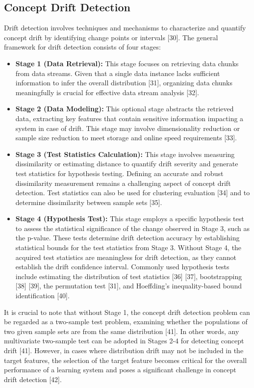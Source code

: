 \subsection{Concept Drift Detection}
Drift detection involves techniques and mechanisms to characterize and quantify concept drift by identifying change points or intervals [30]. The general framework for drift detection consists of four stages:
\begin{itemize}
    \item \textbf{Stage 1 (Data Retrieval):} This stage focuses on retrieving data chunks from data streams. Given that a single data instance lacks sufficient information to infer the overall distribution [31], organizing data chunks meaningfully is crucial for effective data stream analysis [32].
    \item \textbf{Stage 2 (Data Modeling):} This optional stage abstracts the retrieved data, extracting key features that contain sensitive information impacting a system in case of drift. This stage may involve dimensionality reduction or sample size reduction to meet storage and online speed requirements [33].
    \item \textbf{Stage 3 (Test Statistics Calculation):} This stage involves measuring dissimilarity or estimating distance to quantify drift severity and generate test statistics for hypothesis testing. Defining an accurate and robust dissimilarity measurement remains a challenging aspect of concept drift detection. Test statistics can also be used for clustering evaluation [34] and to determine dissimilarity between sample sets [35].
    \item \textbf{Stage 4 (Hypothesis Test):} This stage employs a specific hypothesis test to assess the statistical significance of the change observed in Stage 3, such as the p-value. These tests determine drift detection accuracy by establishing statistical bounds for the test statistics from Stage 3. Without Stage 4, the acquired test statistics are meaningless for drift detection, as they cannot establish the drift confidence interval. Commonly used hypothesis tests include estimating the distribution of test statistics [36] [37], bootstrapping [38] [39], the permutation test [31], and Hoeffding's inequality-based bound identification [40].
\end{itemize}

It is crucial to note that without Stage 1, the concept drift detection problem can be regarded as a two-sample test problem, examining whether the populations of two given sample sets are from the same distribution [41]. In other words, any multivariate two-sample test can be adopted in Stages 2-4 for detecting concept drift [41]. However, in cases where distribution drift may not be included in the target features, the selection of the target feature becomes critical for the overall performance of a learning system and poses a significant challenge in concept drift detection [42].


